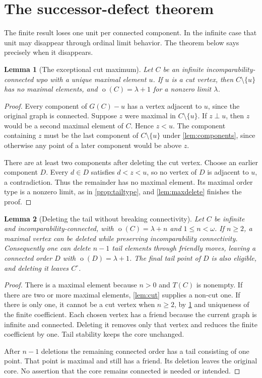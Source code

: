 \documentclass[11pt,a4paper]{article}
\newtheorem{lemma}[lemma]{Lemma}
\theoremstyle{definition}
\theoremstyle{remark}
\DeclareMathOperator{\mot}{o}
\newcommand{\core}[1]{{#1}^{\circ}}
\newcommand{\inc}{\mathbin{\perp}}
\begin{document}
\section{The successor-defect theorem}\label{sec:connected}

The finite result loses one unit per connected component. In the infinite
case that unit may disappear through ordinal limit behavior. The theorem
below says precisely when it disappears.

\begin{lemma}[The exceptional cut maximum]\label{lem:unique-cut}
Let $C$ be an infinite incomparability-connected wpo with a unique maximal
element $u$. If $u$ is a cut vertex, then $C\setminus\{u\}$ has no maximal
elements, and $\mot(C)=\lambda+1$ for a nonzero limit $\lambda$.
\end{lemma}
\begin{proof}
Every component of $G(C)-u$ has a vertex adjacent to $u$, since the original
graph is connected. Suppose $z$ were maximal in $C\setminus\{u\}$. If
$z\inc u$, then $z$ would be a second maximal element of $C$. Hence $z<u$.
The component containing $z$ must be the last component of
$C\setminus\{u\}$ under \cref{lem:components}, since otherwise any point of
a later component would be above $z$.

There are at least two components after deleting the cut vertex. Choose
an earlier component $D$. Every $d\in D$ satisfies $d<z<u$, so no vertex
of $D$ is adjacent to $u$, a contradiction. Thus the remainder has no
maximal element. Its maximal order type is a nonzero limit, as in
\cref{prop:tailtype}, and \cref{lem:maxdelete} finishes the proof.
\end{proof}

\begin{lemma}[Deleting the tail without breaking connectivity]\label{lem:peel}
Let $C$ be infinite and incomparability-connected, with
$\mot(C)=\lambda+n$ and $1\leq n<\omega$. If $n\geq2$, a maximal vertex can be deleted while
preserving incomparability connectivity. Consequently one can delete
$n-1$ tail elements through friendly moves, leaving a connected order
$D$ with $\mot(D)=\lambda+1$. The final tail point of $D$ is also eligible,
and deleting it leaves $\core{C}$.
\end{lemma}
\begin{proof}
There is a maximal element because $n>0$ and $T(C)$ is nonempty. If there
are two or more maximal elements, \cref{lem:cut} supplies a non-cut one.
If there is only one, it cannot be a cut vertex when $n\geq2$, by
\cref{lem:unique-cut} and uniqueness of the finite coefficient. Each chosen
vertex has a friend because the current graph is infinite and connected.
Deleting it removes only that vertex and reduces the finite coefficient by
one. Tail stability keeps the core unchanged.

After $n-1$ deletions the remaining connected order has a tail consisting
of one point. That point is maximal and still has a friend. Its deletion
leaves the original core. No assertion that the core remains connected is
needed or intended.
\end{proof}
\end{document}
